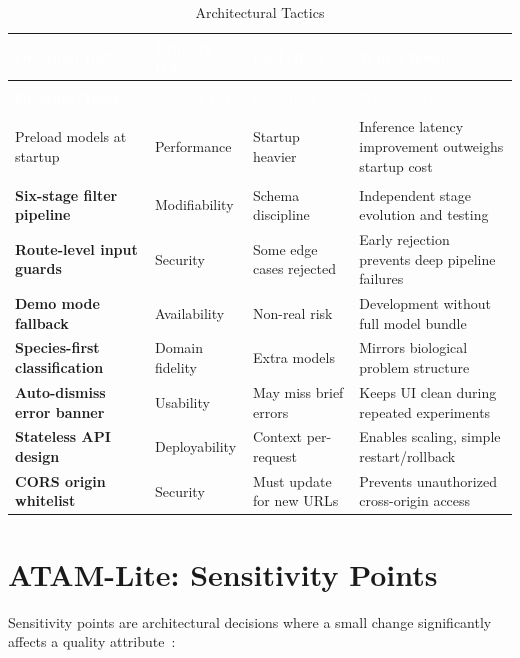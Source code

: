 \documentclass[11pt,a4paper,oneside]{report}
\begin{document}
\begin{longtable}{>{\bfseries\scriptsize}p{2.5cm} >{\scriptsize}p{1.8cm} >{\scriptsize}p{2cm} >{\scriptsize}p{6.5cm}}
\caption{Architectural Tactics} \label{tab:tactics} \\
\toprule
\rowcolor{tableheader}
\textcolor{white}{Decision/Tactic} & \textcolor{white}{Primary QA} & \textcolor{white}{Cost/Risk} & \textcolor{white}{Why Chosen} \\
\midrule
\endfirsthead
\multicolumn{4}{c}{\scriptsize\tablename\ \thetable{} -- continued} \\
\toprule
\rowcolor{tableheader}
\textcolor{white}{Decision/Tactic} & \textcolor{white}{Primary QA} & \textcolor{white}{Cost/Risk} & \textcolor{white}{Why Chosen} \\
\midrule
\endhead
\bottomrule
\endlastfoot

Preload models at startup & Performance & Startup heavier & Inference latency improvement outweighs startup cost \\
\rowcolor{tablerow}
Six-stage filter pipeline & Modifiability & Schema discipline & Independent stage evolution and testing \\
Route-level input guards & Security & Some edge cases rejected & Early rejection prevents deep pipeline failures \\
\rowcolor{tablerow}
Demo mode fallback & Availability & Non-real risk & Development without full model bundle \\
Species-first classification & Domain fidelity & Extra models & Mirrors biological problem structure \\
\rowcolor{tablerow}
Auto-dismiss error banner & Usability & May miss brief errors & Keeps UI clean during repeated experiments \\
Stateless API design & Deployability & Context per-request & Enables scaling, simple restart/rollback \\
\rowcolor{tablerow}
CORS origin whitelist & Security & Must update for new URLs & Prevents unauthorized cross-origin access \\

\end{longtable}


\section{ATAM-Lite: Sensitivity Points}

Sensitivity points are architectural decisions where a small change significantly affects a quality attribute~\cite{kazman2000atam}:
\end{document}
